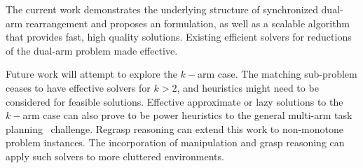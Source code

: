 The current work demonstrates the underlying structure of synchronized dual-arm rearrangement and proposes an \milp formulation, as well as a scalable algorithm \algo that provides fast, high quality solutions. Existing efficient solvers for reductions of the dual-arm problem made \algo effective. 

\cameraready
{
Future work will attempt to explore the $k-$arm case. The matching sub-problem ceases to have effective solvers for $k>2$, and heuristics might need to be considered for feasible solutions. Effective approximate or lazy solutions to the $k-$arm case can also prove to be power heuristics to the general multi-arm task planning~\cite{shome2019multiarm} challenge. Regrasp reasoning can extend this work to non-monotone problem instances. The incorporation of manipulation and grasp reasoning can apply such solvers to more cluttered environments. 
}

